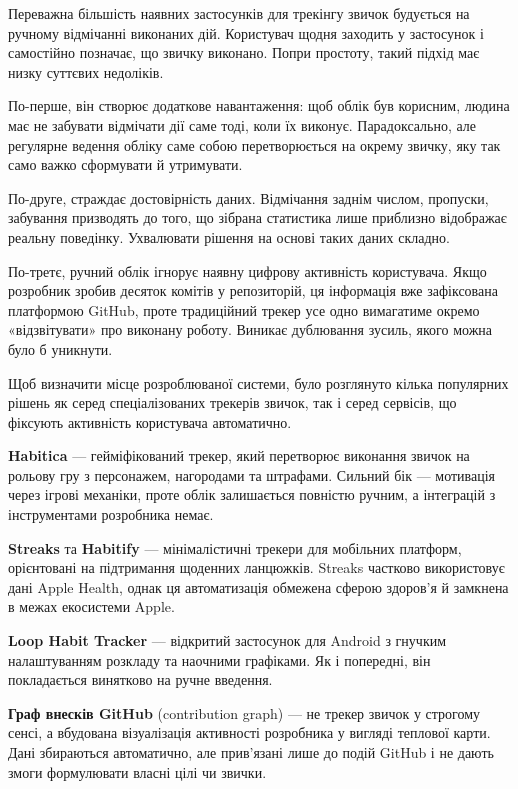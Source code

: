 
Переважна більшість наявних застосунків для трекінгу звичок будується на ручному відмічанні виконаних дій. Користувач щодня заходить у застосунок і самостійно позначає, що звичку виконано. Попри простоту, такий підхід має низку суттєвих недоліків.

По-перше, він створює додаткове навантаження: щоб облік був корисним, людина має не забувати відмічати дії саме тоді, коли їх виконує. Парадоксально, але регулярне ведення обліку саме собою перетворюється на окрему звичку, яку так само важко сформувати й утримувати.

По-друге, страждає достовірність даних. Відмічання заднім числом, пропуски, забування призводять до того, що зібрана статистика лише приблизно відображає реальну поведінку. Ухвалювати рішення на основі таких даних складно.

По-третє, ручний облік ігнорує наявну цифрову активність користувача. Якщо розробник зробив десяток комітів у репозиторій, ця інформація вже зафіксована платформою GitHub, проте традиційний трекер усе одно вимагатиме окремо «відзвітувати» про виконану роботу. Виникає дублювання зусиль, якого можна було б уникнути.


Щоб визначити місце розроблюваної системи, було розглянуто кілька популярних рішень як серед спеціалізованих трекерів звичок, так і серед сервісів, що фіксують активність користувача автоматично.

\textbf{Habitica} — гейміфікований трекер, який перетворює виконання звичок на рольову гру з персонажем, нагородами та штрафами. Сильний бік — мотивація через ігрові механіки, проте облік залишається повністю ручним, а інтеграцій з інструментами розробника немає.

\textbf{Streaks} та \textbf{Habitify} — мінімалістичні трекери для мобільних платформ, орієнтовані на підтримання щоденних ланцюжків. Streaks частково використовує дані Apple Health, однак ця автоматизація обмежена сферою здоров'я й замкнена в межах екосистеми Apple.

\textbf{Loop Habit Tracker} — відкритий застосунок для Android з гнучким налаштуванням розкладу та наочними графіками. Як і попередні, він покладається винятково на ручне введення.

\textbf{Граф внесків GitHub} (contribution graph) — не трекер звичок у строгому сенсі, а вбудована візуалізація активності розробника у вигляді теплової карти. Дані збираються автоматично, але прив'язані лише до подій GitHub і не дають змоги формулювати власні цілі чи звички.

